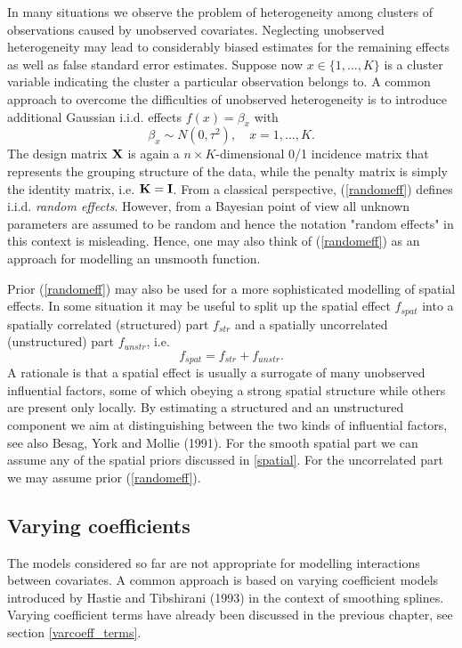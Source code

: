 \documentclass[11pt,a4paper,twoside]{bayesxarticle}
\begin{document}
In many situations we observe the problem of heterogeneity among
clusters of observations caused by unobserved covariates. Neglecting
unobserved heterogeneity may lead to considerably biased estimates
for the remaining effects as well as false standard error estimates.
Suppose now $x \in \{1,\dots,K\}$ is a cluster variable indicating the
cluster a particular observation belongs to. A common approach to
overcome the difficulties of unobserved heterogeneity is to
introduce additional Gaussian i.i.d. effects $f(x) = \beta_{x}$
with
\begin{equation}
\label{randomeff} \beta_{x} \sim N(0,\tau^2), \quad
x=1,\dots,K.
\end{equation}
The design matrix $\mathbf{X}$ is again a $n \times K$-dimensional 0/1
incidence matrix that represents the grouping structure of the data,
while the penalty matrix is simply the identity matrix, i.e.
$\mathbf{K}=\mathbf{I}$. From a classical perspective, (\ref{randomeff}) defines
i.i.d. {\em random effects}. However, from a Bayesian point of view
all unknown parameters are assumed to be random and hence the
notation "random effects" in this context is misleading. Hence, one
may also think of (\ref{randomeff}) as an approach for modelling an
unsmooth function.

Prior (\ref{randomeff}) may also be used for a more sophisticated
modelling of spatial effects. In some situation it may be useful to
split up the spatial effect $f_{spat}$ into a spatially correlated
(structured) part $f_{str}$ and a spatially uncorrelated
(unstructured) part $f_{unstr}$, i.e.
$$
f_{spat} = f_{str}+f_{unstr}.
$$
A rationale is that a spatial effect is usually a surrogate of many
unobserved influential factors, some of which obeying a strong
spatial structure while others are present only locally. By
estimating a structured and an unstructured component we aim at
distinguishing between the two kinds of influential factors, see
also Besag, York and Mollie (1991). For the smooth spatial part we
can assume any of the spatial priors discussed in \autoref{spatial}.
For the uncorrelated part we may assume prior (\ref{randomeff}).

\subsection{Varying coefficients}

The models considered so far are not appropriate for modelling
interactions between covariates. A common approach is based on
varying coefficient models introduced by Hastie and Tibshirani
(1993) in the context of smoothing splines. Varying coefficient
terms have already been discussed in the previous chapter, see
section \ref{varcoeff_terms}.
\end{document}
